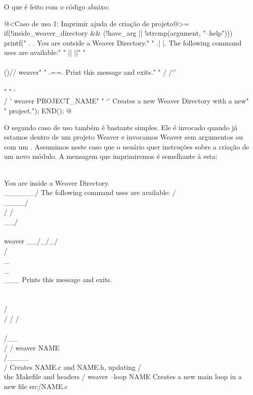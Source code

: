 {O que é feito com o código abaixo:


\iniciocodigo
@<Caso de uso 1: Imprimir ajuda de criação de projeto@>=
if(!inside_weaver_directory && (!have_arg || !strcmp(argument, "--help"))){
  printf("    .  .     You are outside a Weaver Directory.\n"
  "   .|  |.    The following command uses are available:\n"
  "   ||  ||\n"
  "   \\\\()//  weaver\n"
  "   .={}=.      Print this message and exits.\n"
  "  / /`'\\ \\\n"
  "  ` \\  / '  weaver PROJECT_NAME\n"
  "     `'        Creates a new Weaver Directory with a new\n"
  "                project.\n");
  END();
}
@
\fimcodigo



O segundo caso de uso também é bastante simples. Ele é invocado quando
já estamos dentro de um projeto Weaver e invocamos Weaver sem
argumentos ou com um . Assumimos neste caso que o
usuário quer instruções sobre a criação de um novo módulo. A mensagem
que imprimiremos é semelhante à esta:

\alinhaverbatim
       \\              You are inside a Weaver Directory.
        \\______/      The following command uses are available:
        /\\____/\\
       / /\\__/\\ \\       weaver
    __/_/_/\\/\\_\\_\\___     Prints this message and exits.
      \\ \\ \\/\\/ / /
       \\ \\/__\\/ /       weaver NAME
        \\/____\\/          Creates NAME.c and NAME.h, updating
        /      \\          the Makefile and headers
       /
                          weaver --loop NAME
                           Creates a new main loop in a new file src/NAME.c

}
